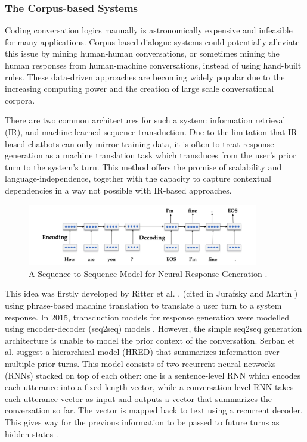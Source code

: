 \documentclass[bsc,frontabs,twoside,singlespacing,parskip,deptreport]{infthesis}     %
\begin{document}
\subsubsection*{The Corpus-based Systems}

Coding conversation logics manually is astronomically expensive and infeasible for many applications. Corpus-based dialogue systems could potentially alleviate this issue by mining human-human conversations, or sometimes mining the human responses from human-machine conversations, instead of using hand-built rules. These data-driven approaches are becoming widely popular due to the increasing computing power and the creation of large scale conversational corpora. 

There are two common architectures for such a system: information retrieval (IR), and machine-learned sequence transduction. Due to the limitation that IR-based chatbots can only mirror training data, it is often to treat response generation as a machine translation task which transduces from the user’s prior turn to the system’s turn. This method offers the promise of scalability and language-independence, together with the capacity to capture contextual dependencies in a way not possible with IR-based approaches.

\begin{figure}[h]
    \centering
    \includegraphics[width=0.9\textwidth]{seq2seq.jpeg}
    \caption{A Sequence to Sequence Model for Neural Response Generation \cite{jurafsky2019speech}.}
    \label{fig:seq2seq}
\end{figure}

This idea was firstly developed by Ritter et al. \cite{ritter2011data}. (cited in Jurafsky and Martin \cite{jurafsky2019speech}) using phrase-based machine translation to translate a user turn to a system response. In 2015, transduction models for response generation were modelled using encoder-decoder (seq2seq) models \cite{shang2015neural,strub2017end,sordoni2015neural}. However, the simple seq2seq generation architecture is unable to model the prior context of the conversation. Serban et al. \cite{serban2016building} suggest a hierarchical model (HRED) that summarizes information over multiple prior turns. This model consists of two recurrent neural networks (RNNs) stacked on top of each other: one is a sentence-level RNN which encodes each utterance into a fixed-length vector, while a conversation-level RNN takes each utterance vector as input and outputs a vector that summarizes the conversation so far. The vector is mapped back to text using a recurrent decoder. This gives way for the previous information to be passed to future turns as hidden states \cite{lowe2017training}.
\end{document}

